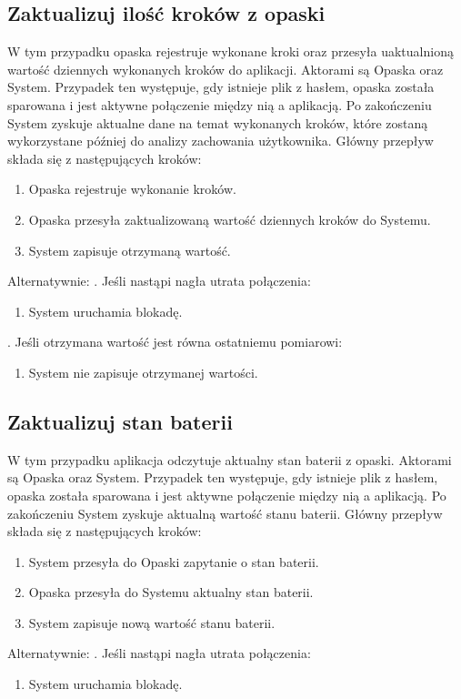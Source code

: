 \subsection{Zaktualizuj ilość kroków z opaski}
W tym przypadku opaska rejestruje wykonane kroki oraz przesyła uaktualnioną wartość dziennych wykonanych kroków do aplikacji. Aktorami są Opaska oraz System. Przypadek ten występuje, gdy istnieje plik z hasłem, opaska została sparowana i jest aktywne połączenie między nią a aplikacją. Po zakończeniu System zyskuje aktualne dane na temat wykonanych kroków, które zostaną wykorzystane później do analizy zachowania użytkownika. Główny przepływ składa się z następujących kroków:
\begin{enumerate}
    \item Opaska rejestruje wykonanie kroków.
    \item Opaska przesyła zaktualizowaną wartość dziennych kroków do Systemu.
    \item System zapisuje otrzymaną wartość.
\end{enumerate}
Alternatywnie:
\newline\newline
{}. Jeśli nastąpi nagła utrata połączenia:
\begin{enumerate}[leftmargin=3\parindent]
    \item System uruchamia blokadę.
\end{enumerate}
\quad\newline
{}. Jeśli otrzymana wartość jest równa ostatniemu pomiarowi:
\begin{enumerate}[leftmargin=3\parindent]
    \item System nie zapisuje otrzymanej wartości.
\end{enumerate}

\subsection{Zaktualizuj stan baterii}
W tym przypadku aplikacja odczytuje aktualny stan baterii z opaski. Aktorami są Opaska oraz System. Przypadek ten występuje, gdy istnieje plik z hasłem, opaska została sparowana i jest aktywne połączenie między nią a aplikacją. Po zakończeniu System zyskuje aktualną wartość stanu baterii. Główny przepływ składa się z następujących kroków:
\begin{enumerate}
    \item System przesyła do Opaski zapytanie o stan baterii.
    \item Opaska przesyła do Systemu aktualny stan baterii.
    \item System zapisuje nową wartość stanu baterii.
\end{enumerate}
Alternatywnie:
\newline\newline
{}. Jeśli nastąpi nagła utrata połączenia:
\begin{enumerate}[leftmargin=3\parindent]
    \item System uruchamia blokadę.
\end{enumerate}

